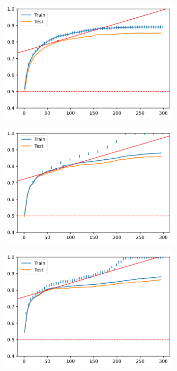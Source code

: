\begin{figure}[H]
\begin{subfigure}[b]{0.32\linewidth}
        \includegraphics[width=\linewidth]{img/ch5/sampling/300-s5-p05-pre.png}
    \end{subfigure}
    \begin{subfigure}[b]{0.32\linewidth}
        \includegraphics[width=\linewidth]{img/ch5/sampling/300-s20-p01.png}
    \end{subfigure}
    \begin{subfigure}[b]{0.32\linewidth}
        \includegraphics[width=\linewidth]{img/ch5/sampling/300-s5-p01.png}

\end{subfigure}
\end{figure}
